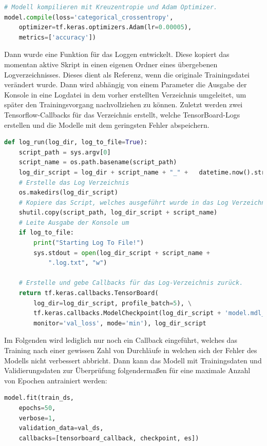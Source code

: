 \documentclass[11pt,bibliography=totocnumbered]{scrartcl}
\begin{document}
\begin{lstlisting}[language=python,firstnumber=1,caption={Kompilierung eines Modells},label=lst:compile_model]
# Modell kompilieren mit Kreuzentropie und Adam Optimizer.
model.compile(loss='categorical_crossentropy',
	optimizer=tf.keras.optimizers.Adam(lr=0.00005),
	metrics=['accuracy'])
\end{lstlisting}
Dann wurde eine Funktion für das Loggen entwickelt. Diese kopiert das momentan aktive Skript in einen eigenen Ordner eines übergebenen Logverzeichnisses. Dieses dient als Referenz, wenn die originale Trainingsdatei verändert wurde. Dann wird abhängig von einem Parameter die Ausgabe der Konsole in eine Logdatei in dem vorher erstellten Verzeichnis umgeleitet, um später den Trainingsvorgang nachvollziehen zu können. Zuletzt werden zwei Tensorflow-Callbacks für das Verzeichnis erstellt, welche TensorBoard-Logs erstellen und die Modelle mit dem geringsten Fehler abspeichern.
\begin{lstlisting}[language=python,firstnumber=1,caption={Logging Funktion für Trainingsvorgänge},label=lst:log_train]
def log_run(log_dir, log_to_file=True):
	script_path = sys.argv[0]
	script_name = os.path.basename(script_path)
	log_dir_script = log_dir + script_name + "_" + 	 datetime.now().strftime("%d-%m-%Y_%H%M%S") + "/"
	# Erstelle das Log Verzeichnis
	os.makedirs(log_dir_script)
	# Kopiere das Script, welches ausgeführt wurde in das Log Verzeichnis
	shutil.copy(script_path, log_dir_script + script_name)
	# Leite Ausgabe der Konsole um
	if log_to_file:
		print("Starting Log To File!")
		sys.stdout = open(log_dir_script + script_name + 
			".log.txt", "w")
	
	# Erstelle und gebe Callbacks für das Log-Verzeichnis zurück.
	return tf.keras.callbacks.TensorBoard(
		log_dir=log_dir_script, profile_batch=5), \
		tf.keras.callbacks.ModelCheckpoint(log_dir_script + 'model.mdl_wts.hdf5', save_best_only=True,
		monitor='val_loss', mode='min'), log_dir_script
\end{lstlisting}
Im Folgenden wird lediglich nur noch ein Callback eingeführt, welches das Training nach einer gewissen Zahl von Durchläufe in welchen sich der Fehler des Modells nicht verbessert abbricht. Dann kann das Modell mit Trainingsdaten und Validierungsdaten zur Überprüfung folgendermaßen für eine maximale Anzahl von Epochen antrainiert werden:
\begin{lstlisting}[language=python,firstnumber=1,caption={Start des Trainings mit Keras},label=lst:train_start]
model.fit(train_ds,
	epochs=50,
	verbose=1,
	validation_data=val_ds,
	callbacks=[tensorboard_callback, checkpoint, es])
\end{lstlisting}
\end{document}

